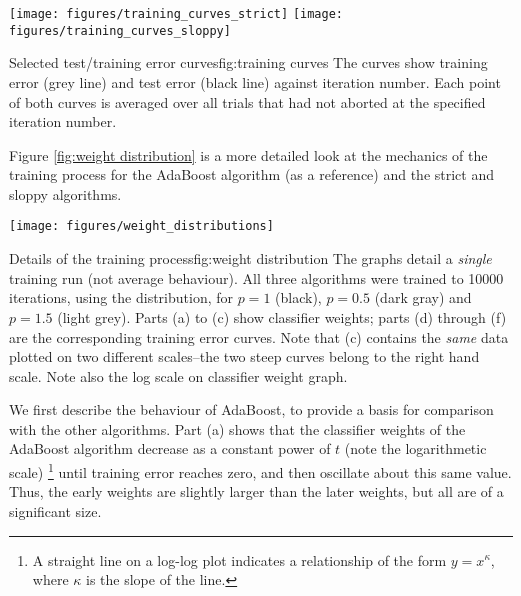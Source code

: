 \begin{linefigure}
\begin{center}
\texttt{[image: figures/training\_curves\_strict]}
\texttt{[image: figures/training\_curves\_sloppy]}
\end{center}
\begin{capt}{Selected test/training error curves}{fig:training curves}
The curves show training error (grey line) and test error (black
line) against iteration number.  Each point of both curves is
averaged over all trials that had not aborted at the specified
iteration number.
\end{capt}
\end{linefigure}

Figure \ref{fig:weight distribution} is a more detailed look at the
mechanics of the training process for the AdaBoost algorithm (as a
reference) and the strict and sloppy algorithms.

\begin{linefigure}
\begin{center}
\hspace*{-1cm}\texttt{[image: figures/weight\_distributions]}
\end{center}
\begin{capt}{Details of the training process}{fig:weight distribution}
The graphs detail a \emph{single} training run (not average
behaviour).  All three algorithms were trained to 10000 iterations,
using the  distribution, for $p=1$ (black), $p=0.5$
(dark gray) and $p=1.5$ (light grey).  Parts (a) to (c) show
classifier weights; parts (d) through (f) are the corresponding
training error curves.  Note that (c) contains the \emph{same} data
plotted on two different scales--the two steep curves belong to the
right hand scale.  Note also the log scale on classifier weight graph.
\end{capt}
\end{linefigure}

We first describe the behaviour of AdaBoost, to provide a basis for
comparison with the other algorithms.  Part (a) shows that the
classifier weights of the AdaBoost algorithm decrease as a constant
power of $t$ (note the logarithmetic scale)%
\footnote{A straight line on a log-log plot indicates a relationship
of the form $y = x^{\kappa}$, where $\kappa$ is the slope of the line.}
until training error reaches zero, and then oscillate about this same
value.  Thus, the early weights are slightly larger than the later
weights, but all are of a significant size.

